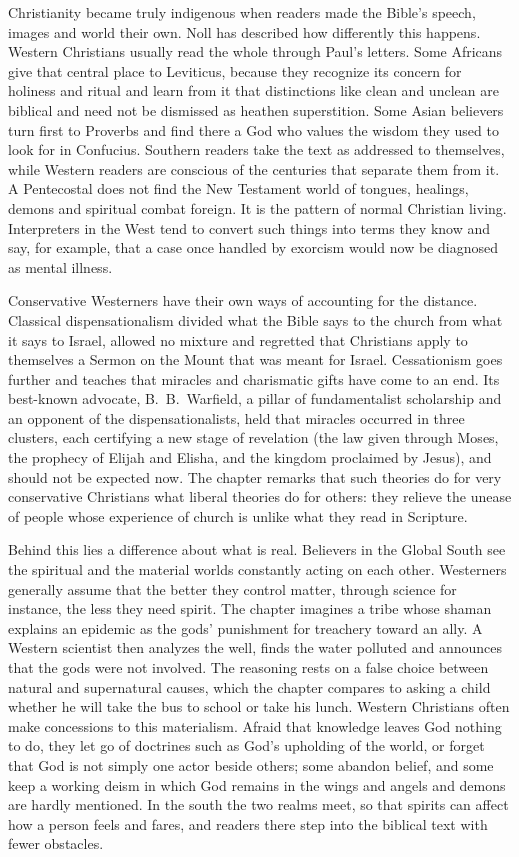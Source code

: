 Christianity became truly indigenous when readers made the Bible's speech, images and world their
own. Noll has described how differently this happens. Western Christians usually read the whole
through Paul's letters. Some Africans give that central place to Leviticus, because they recognize
its concern for holiness and ritual and learn from it that distinctions like clean and unclean are
biblical and need not be dismissed as heathen superstition. Some Asian believers turn first to
Proverbs and find there a God who values the wisdom they used to look for in Confucius. Southern
readers take the text as addressed to themselves, while Western readers are conscious of the
centuries that separate them from it. A Pentecostal does not find the New Testament world of tongues,
healings, demons and spiritual combat foreign. It is the pattern of normal Christian living.
Interpreters in the West tend to convert such things into terms they know and say, for example, that
a case once handled by exorcism would now be diagnosed as mental illness.

Conservative Westerners have their own ways of accounting for the distance. Classical
dispensationalism divided what the Bible says to the church from what it says to Israel, allowed no
mixture and regretted that Christians apply to themselves a Sermon on the Mount that was meant for
Israel. Cessationism goes further and teaches that miracles and charismatic gifts have come to an
end. Its best-known advocate, B.~B.~Warfield, a pillar of fundamentalist scholarship and an opponent
of the dispensationalists, held that miracles occurred in three clusters, each certifying a new stage
of revelation (the law given through Moses, the prophecy of Elijah and Elisha, and the kingdom
proclaimed by Jesus), and should not be expected now. The chapter remarks that such theories do for
very conservative Christians what liberal theories do for others: they relieve the unease of people
whose experience of church is unlike what they read in Scripture.

Behind this lies a difference about what is real. Believers in the Global South see the spiritual
and the material worlds constantly acting on each other. Westerners generally assume that the better
they control matter, through science for instance, the less they need spirit. The chapter imagines a
tribe whose shaman explains an epidemic as the gods' punishment for treachery toward an ally. A
Western scientist then analyzes the well, finds the water polluted and announces that the gods were
not involved. The reasoning rests on a false choice between natural and supernatural causes, which
the chapter compares to asking a child whether he will take the bus to school or take his lunch.
Western Christians often make concessions to this materialism. Afraid that knowledge leaves God
nothing to do, they let go of doctrines such as God's upholding of the world, or forget that God is
not simply one actor beside others; some abandon belief, and some keep a working deism in which God
remains in the wings and angels and demons are hardly mentioned. In the south the two realms meet,
so that spirits can affect how a person feels and fares, and readers there step into the biblical
text with fewer obstacles.

